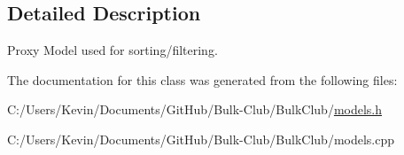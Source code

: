 \subsection{Detailed Description}
Proxy Model used for sorting/filtering. 

The documentation for this class was generated from the following files\+:\begin{DoxyCompactItemize}
\item 
C\+:/\+Users/\+Kevin/\+Documents/\+Git\+Hub/\+Bulk-\/\+Club/\+Bulk\+Club/\mbox{\hyperlink{models_8h}{models.\+h}}\item 
C\+:/\+Users/\+Kevin/\+Documents/\+Git\+Hub/\+Bulk-\/\+Club/\+Bulk\+Club/models.\+cpp\end{DoxyCompactItemize}
